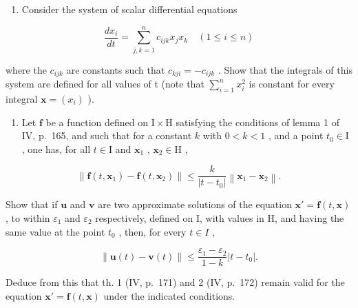 \begin{enumerate}
\def\labelenumi{\arabic{enumi})}
\setcounter{enumi}{6}
\tightlist
\item
  Consider the system of scalar differential equations
\end{enumerate}

\[
\frac {d x _ {i}}{d t} = \sum_ {j, k = 1} ^ {n} c _ {i j k} x _ {j} x _ {k} \quad (1 \leqslant i \leqslant n)
\]

where the \(c_{ijk}\) are constants such that \(c_{kji} = -c_{ijk}\) . Show that the integrals of this system are defined for all values of t (note that \(\sum_{i=1}^{n} x_{i}^{2}\) is constant for every integral \(\mathbf{x} = (x_{i})\) ).

\begin{enumerate}
\def\labelenumi{\arabic{enumi})}
\setcounter{enumi}{7}
\tightlist
\item
  Let \(\mathbf{f}\) be a function defined on \(\mathrm{I} \times \mathrm{H}\) satisfying the conditions of lemma 1 of IV, p.~165, and such that for a constant \(k\) with \(0 < k < 1\) , and a point \(t_0 \in \mathrm{I}\) , one has, for all \(t \in \mathrm{I}\) and \(\mathbf{x}_1\) , \(\mathbf{x}_2 \in \mathrm{H}\) ,
\end{enumerate}

\[
\left\| \mathbf {f} (t, \mathbf {x} _ {1}) - \mathbf {f} (t, \mathbf {x} _ {2}) \right\| \leqslant \frac {k}{\left| t - t _ {0} \right|} \left\| \mathbf {x} _ {1} - \mathbf {x} _ {2} \right\|.
\]

Show that if \(\mathbf{u}\) and \(\mathbf{v}\) are two approximate solutions of the equation \(\mathbf{x}' = \mathbf{f}(t, \mathbf{x})\) , to within \(\varepsilon_1\) and \(\varepsilon_2\) respectively, defined on I, with values in H, and having the same value at the point \(t_0\) , then, for every \(t \in I\) ,

\[
\left\| \mathbf {u} (t) - \mathbf {v} (t) \right\| \leqslant \frac {\varepsilon_ {1} - \varepsilon_ {2}}{1 - k} | t - t _ {0} |.
\]

Deduce from this that th. 1 (IV, p.~171) and 2 (IV, p.~172) remain valid for the equation \(\mathbf{x}' = \mathbf{f}(t, \mathbf{x})\) under the indicated conditions.

